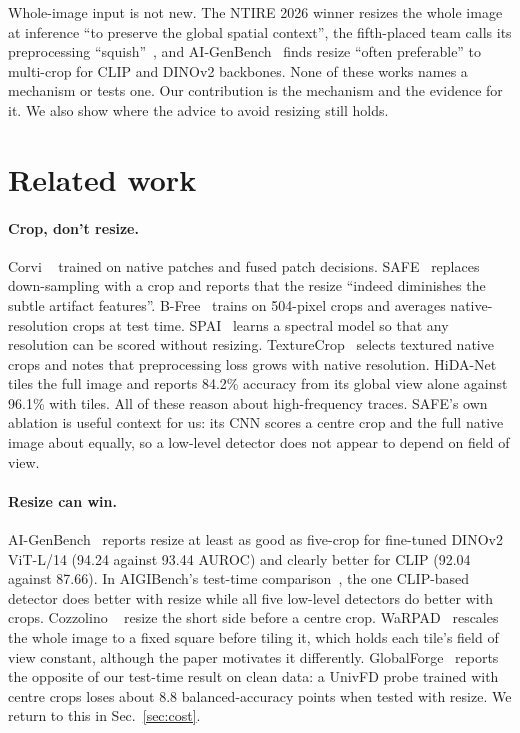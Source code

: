 \documentclass[10pt,twocolumn,letterpaper]{article}
\begin{document}
Whole-image input is not new. The NTIRE 2026 winner resizes the whole image at
inference ``to preserve the global spatial context'', the fifth-placed team
calls its preprocessing ``squish''~\cite{gushchin2026ntire}, and
AI-GenBench~\cite{pellegrini2025aigenbench} finds resize ``often preferable''
to multi-crop for CLIP and DINOv2 backbones. None of these works names a
mechanism or tests one. Our contribution is the mechanism and the evidence
for it. We also show where the advice to avoid resizing still holds.

\section{Related work}
\label{sec:related}

\paragraph{Crop, don't resize.} Corvi \etal~\cite{corvi2023detection} trained
on native patches and fused patch decisions. SAFE~\cite{li2025safe} replaces
down-sampling with a crop and reports that the resize ``indeed diminishes the
subtle artifact features''. B-Free~\cite{guillaro2025bfree} trains on
504-pixel crops and averages native-resolution crops at test time.
SPAI~\cite{karageorgiou2025spai} learns a spectral model so that any
resolution can be scored without resizing. TextureCrop~\cite{konstantinidou2025texturecrop}
selects textured native crops and notes that preprocessing loss grows with
native resolution. HiDA-Net~\cite{mu2026hidanet} tiles the full image and
reports 84.2\% accuracy from its global view alone against 96.1\% with tiles.
All of these reason about high-frequency traces. SAFE's own ablation is
useful context for us: its CNN scores a centre crop and the full native image
about equally, so a low-level detector does not appear to depend on field of
view.

\paragraph{Resize can win.} AI-GenBench~\cite{pellegrini2025aigenbench}
reports resize at least as good as five-crop for fine-tuned DINOv2 ViT-L/14
(94.24 against 93.44 AUROC) and clearly better for CLIP (92.04 against 87.66).
In AIGIBench's test-time comparison~\cite{li2025aigibench}, the one CLIP-based
detector does better with resize while all five low-level detectors do better
with crops. Cozzolino \etal~\cite{cozzolino2024raising} resize the short side
before a centre crop. WaRPAD~\cite{choi2025warpad} rescales the whole image to
a fixed square before tiling it, which holds each tile's field of view
constant, although the paper motivates it differently. GlobalForge~\cite{cui2026globalforge}
reports the opposite of our test-time result on clean data: a UnivFD probe
trained with centre crops loses about 8.8 balanced-accuracy points when tested
with resize. We return to this in Sec.~\ref{sec:cost}.
\end{document}
